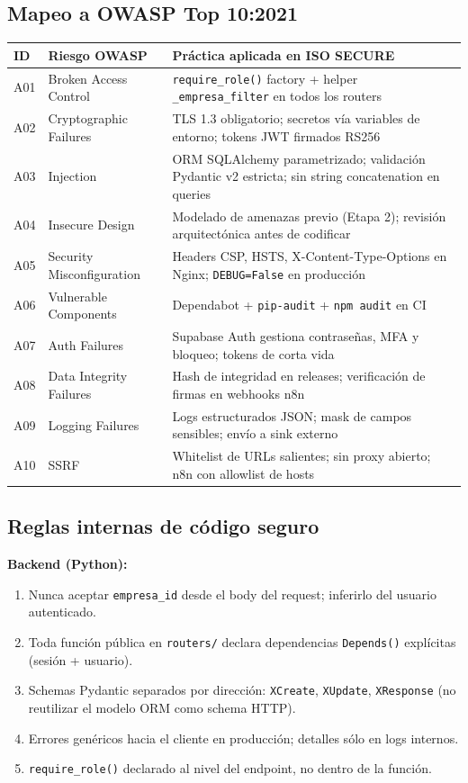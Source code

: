 \documentclass[12pt,a4paper,oneside]{article}
\begin{document}
\subsection{Mapeo a OWASP Top 10:2021}

\begin{longtable}{p{1cm}p{4cm}p{8cm}}
\toprule
\textbf{ID} & \textbf{Riesgo OWASP} & \textbf{Práctica aplicada en ISO SECURE} \\
\midrule
\endhead
A01 & Broken Access Control & \texttt{require\_role()} factory + helper \texttt{\_empresa\_filter} en todos los routers \\
A02 & Cryptographic Failures & TLS 1.3 obligatorio; secretos vía variables de entorno; tokens JWT firmados RS256 \\
A03 & Injection & ORM SQLAlchemy parametrizado; validación Pydantic v2 estricta; sin string concatenation en queries \\
A04 & Insecure Design & Modelado de amenazas previo (Etapa 2); revisión arquitectónica antes de codificar \\
A05 & Security Misconfiguration & Headers CSP, HSTS, X-Content-Type-Options en Nginx; \texttt{DEBUG=False} en producción \\
A06 & Vulnerable Components & Dependabot + \texttt{pip-audit} + \texttt{npm audit} en CI \\
A07 & Auth Failures & Supabase Auth gestiona contraseñas, MFA y bloqueo; tokens de corta vida \\
A08 & Data Integrity Failures & Hash de integridad en releases; verificación de firmas en webhooks n8n \\
A09 & Logging Failures & Logs estructurados JSON; mask de campos sensibles; envío a sink externo \\
A10 & SSRF & Whitelist de URLs salientes; sin proxy abierto; n8n con allowlist de hosts \\
\bottomrule
\end{longtable}

\subsection{Reglas internas de código seguro}

\textbf{Backend (Python):}
\begin{enumerate}[leftmargin=*]
  \item Nunca aceptar \texttt{empresa\_id} desde el body del request; inferirlo del usuario autenticado.
  \item Toda función pública en \texttt{routers/} declara dependencias \texttt{Depends()} explícitas (sesión + usuario).
  \item Schemas Pydantic separados por dirección: \texttt{XCreate}, \texttt{XUpdate}, \texttt{XResponse} (no reutilizar el modelo ORM como schema HTTP).
  \item Errores genéricos hacia el cliente en producción; detalles sólo en logs internos.
  \item \texttt{require\_role()} declarado al nivel del endpoint, no dentro de la función.
\end{enumerate}
\end{document}
